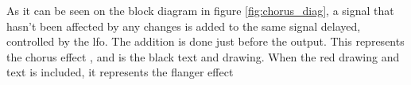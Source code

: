 As it can be seen on the block diagram in figure \autoref{fig:chorus_diag}, a signal that hasn't been affected by any changes is added to the same signal delayed, controlled by the \gls{lfo}. The addition is done just before the output. This represents the chorus effect \citep{chorus_projectpaper}, and is the black text and drawing. When the red drawing and text is included, it represents the flanger effect  \\









